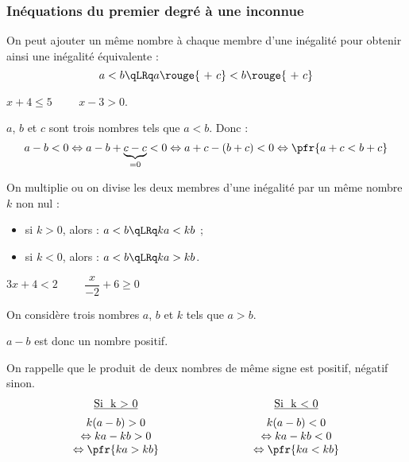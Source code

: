 \documentclass[10pt,openright,twoside,french]{book}
\begin{document}
\pagestyle{empty}

\subsubsection{Inéquations du premier degré à une inconnue}

\begin{Prop}
    On peut ajouter un même nombre à chaque membre d'une inégalité pour obtenir ainsi une inégalité équivalente :
    \[a < b \qLRq a \rouge{\ +\ c } < b \rouge{\ +\ c}\]
\end{Prop}

\begin{Exemple}[s]
$x + 4 \leq 5 \hspace{1cm} x - 3 > 0$.
\end{Exemple}

\begin{Demo}
    $a$, $b$ et $c$ sont trois nombres tels que $a < b$. Donc :
    \[a - b < 0 \Leftrightarrow a - b + \underbrace{c - c}_{= 0} < 0 \Leftrightarrow a + c - (b + c) < 0 \Leftrightarrow \pfr{a + c < b + c}\]
\end{Demo}

\begin{Prop}
    On multiplie ou on divise les deux membres d'une inégalité par un même nombre $k$ non nul :
    \begin{itemize}
        \item si $k > 0$, alors : \quad $a < b \qLRq ka < kb$ ;
        \item si $k < 0$, alors : \quad $a < b \qLRq ka > kb$.
    \end{itemize}
\end{Prop}

\begin{Exemple}[s]
$3x + 4 < 2 \hspace{1cm} \dfrac{x}{-2} +6\geq 0$
\end{Exemple}

\begin{Demo}
    On considère trois nombres $a$, $b$ et $k$ tels que $a > b$.\par
    $a - b$ est donc un nombre positif.\par
    On rappelle que le produit de deux nombres de même signe est positif, négatif sinon.
    \[\begin{array}{c@{\hspace*{3cm}}c}
        \underbar{\text{Si } k > 0} & \underbar{\text{Si } k < 0} \\[5pt]
        k(a - b) > 0 & k(a - b) < 0 \\
        \Leftrightarrow ka - kb > 0 & \Leftrightarrow ka - kb < 0 \\
        \Leftrightarrow \pfr{ka > kb} & \Leftrightarrow \pfr{ka < kb}
    \end{array}\]
\end{Demo}\medskip
\end{document}
